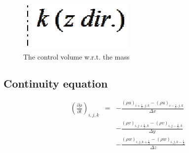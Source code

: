 \begin{figure}[t]
\begin{center}
  \includegraphics[scale=0.7]{./figure/cntrl-volume.eps}
\end{center}
  \caption{The control volume w.r.t. the mass}
  \label{fig:cntrl-volume}
\end{figure}


\subsection{Continuity equation}
\begin{eqnarray}
\left(\frac{\partial \rho}{\partial t}\right)_{i,j,k}
&=& - \frac{(\rho u)_{i+\frac{1}{2},j,k} -(\rho u)_{i-\frac{1}{2},j,k}}{\Delta x}\nonumber\\
& & - \frac{(\rho v)_{i,j+\frac{1}{2},k} -(\rho v)_{i,j-\frac{1}{2},k}}{\Delta y}\nonumber\\
& & - \frac{(\rho w)_{i,j,k+\frac{1}{2}} -(\rho w)_{i,j,k-\frac{1}{2}}}{\Delta z}
\end{eqnarray}


